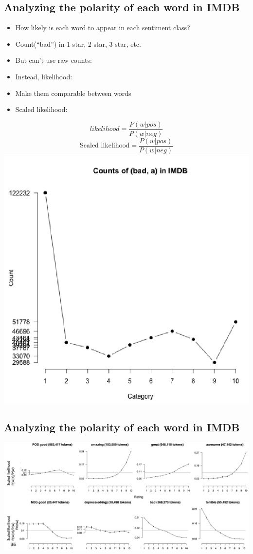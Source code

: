 \documentclass[11pt]{article}
\theoremstyle{definition}
\begin{document}
\subsection{Analyzing the polarity of each word in IMDB}
\begin{itemize}
  \item How likely is each word to appear in each sentiment class?
  \item Count(“bad”) in 1-star, 2-star, 3-star, etc.
  \item But can’t use raw counts:
  \item Instead, likelihood:
  \item Make them comparable between words
  \item Scaled likelihood:
\end{itemize}
\begin{equation}
  likelihood = \frac{P(w|pos)}{P(w|neg)}
\end{equation}
\begin{equation}
  \text{Scaled likelihood} = \frac{P(w|pos)}{P(w|neg)}
\end{equation}
\includegraphics[width=\textwidth/4]{15.png}

\subsection{Analyzing the polarity of each word in IMDB}
\includegraphics[width=\textwidth]{16.png}
\end{document}
